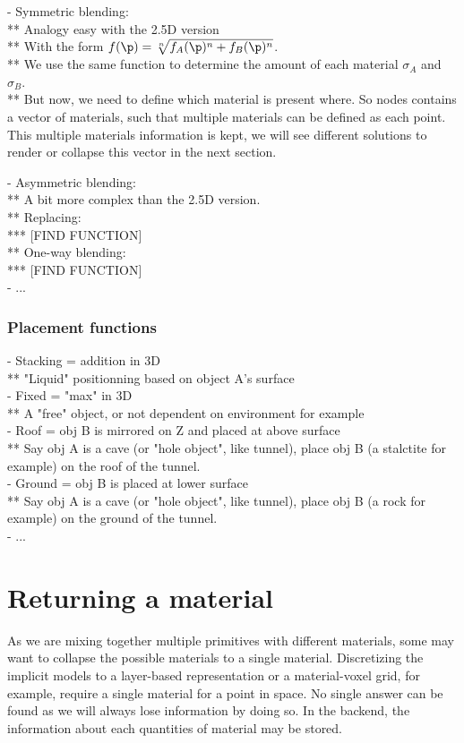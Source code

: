 - Symmetric blending: \\
** Analogy easy with the 2.5D version \\
** With the form $f(\p) = \sqrt[n]{f_A(\p)^n + f_B(\p)^n}$. \\
** We use the same function to determine the amount of each material $\sigma_A$ and $\sigma_B$. \\
** But now, we need to define which material is present where. So nodes contains a vector of materials, such that multiple materials can be defined as each point. This multiple materials information is kept, we will see different solutions to render or collapse this vector in the next section.

- Asymmetric blending: \\
** A bit more complex than the 2.5D version. \\
** Replacing: \\
*** [FIND FUNCTION] \\
** One-way blending: \\
*** [FIND FUNCTION] \\
- ...

\subsubsection{Placement functions}
- Stacking = addition in 3D \\
** "Liquid" positionning based on object A's surface \\
- Fixed = "max" in 3D \\
** A "free" object, or not dependent on environment for example \\
- Roof = obj B is mirrored on Z and placed at above surface \\
** Say obj A is a cave (or "hole object", like tunnel), place obj B (a stalctite for example) on the roof of the tunnel. \\
- Ground = obj B is placed at lower surface \\
** Say obj A is a cave (or "hole object", like tunnel), place obj B (a rock for example) on the ground of the tunnel. \\
- ...

\section{Returning a material}
As we are mixing together multiple primitives with different materials, some may want to collapse the possible materials to a single material. Discretizing the implicit models to a layer-based representation or a material-voxel grid, for example, require a single material for a point in space. No single answer can be found as we will always lose information by doing so. In the backend, the information about each quantities of material may be stored.

